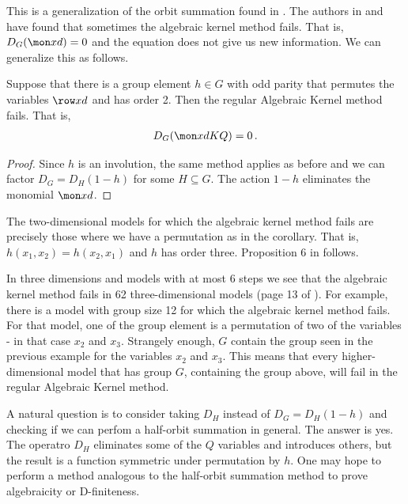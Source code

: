 This is a generalization of the orbit summation found in \cite{melczer2014variants}. The authors in \cite{bousquet2010walks} and \cite{bostan2014three} have found that sometimes the algebraic kernel method fails. That is, $D_G(\mon xd) = 0$ and the equation does not give us new information. We can generalize this as follows.

\begin{corollary} Suppose that there is a group element $h \in G$ with odd parity that permutes the variables $\row xd$ and has order 2. Then the regular Algebraic Kernel method fails. That is,
\begin{align}
D_G(\mon xd KQ) = 0\,.
\end{align}
\end{corollary}
\begin{proof} Since $h$ is an involution, the same method applies as before and we can factor $D_G = D_H(1-h)$ for some $H \subseteq G$. The action $1-h$ eliminates the monomial $\mon xd$.
\end{proof}

\begin{example} The two-dimensional models for which the algebraic kernel method fails are precisely those where we have a permutation as in the corollary. That is, $h(x_1,x_2)= h(x_2,x_1)$ and $h$ has order three. Proposition 6 in \cite{bousquet2010walks} follows.
\end{example}

\begin{example} In three dimensions and models with at most 6 steps we see that the algebraic kernel method fails in 62 three-dimensional models (page 13 of \cite{bostan2014three}). For example, there is a model with group size 12 for which the algebraic kernel method fails. For that model, one of the group element is a permutation of two of the variables - in that case $x_2$ and $x_3$. Strangely enough, $G$ contain the group seen in the previous example for the variables $x_2$ and $x_3$. This means that every higher-dimensional model that has group $G$, containing the group above, will fail in the regular Algebraic Kernel method.
\end{example}
A natural question is to consider taking $D_H$ instead of $D_G = D_H(1-h)$ and checking if we can perfom a half-orbit summation in general. The answer is yes. The operatro $D_H$ eliminates some of the $Q$ variables and introduces others, but the result is a function symmetric under permutation by $h$. One may hope to perform a method analogous to the half-orbit summation method to prove algebraicity or D-finiteness.

